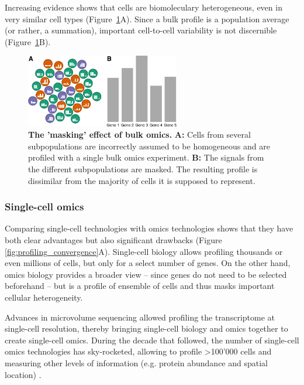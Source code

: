 Increasing evidence shows that cells are biomoleculary heterogeneous, even in very similar cell types \cite{hwang_singlecellrnasequencing_2018} (Figure~\ref{fig:bulk_vs_sc}A). Since a bulk profile is a population average (or rather, a summation), important cell-to-cell variability is not discernible (Figure~\ref{fig:bulk_vs_sc}B). 

\begin{figure}[htb!]
	\centering
	\includegraphics[width=0.6\textwidth]{fig/bulk_vs_sc} 
	\caption{
		\textbf{The 'masking' effect of bulk omics.} 
		\textbf{A:} Cells from several subpopulations are incorrectly assumed to be homogeneous and are profiled with a single bulk omics experiment.
		\textbf{B:} The signals from the different subpopulations are masked. The resulting profile is dissimilar from the majority of cells it is supposed to represent.
	}
	\label{fig:bulk_vs_sc}
\end{figure}

\subsubsection{Single-cell omics}
Comparing single-cell technologies with omics technologies shows that they have both clear advantages but also significant drawbacks (Figure \ref{fig:profiling_convergence}A). Single-cell biology allows profiling thousands or even millions of cells, but only for a select number of genes. On the other hand, omics biology provides a broader view -- since genes do not need to be selected beforehand -- but is a profile of ensemble of cells and thus masks important cellular heterogeneity.

Advances in microvolume sequencing allowed profiling the transcriptome at single-cell resolution, thereby bringing single-cell biology and omics together to create single-cell omics. During the decade that followed, the number of single-cell omics technologies has sky-rocketed, allowing to profile >100'000 cells \cite{svensson_exponentialscalingsinglecell_2018} and measuring other levels of information (e.g. protein abundance and spatial location) \cite{moudgil_multimodalscrnaseq_2019}.

